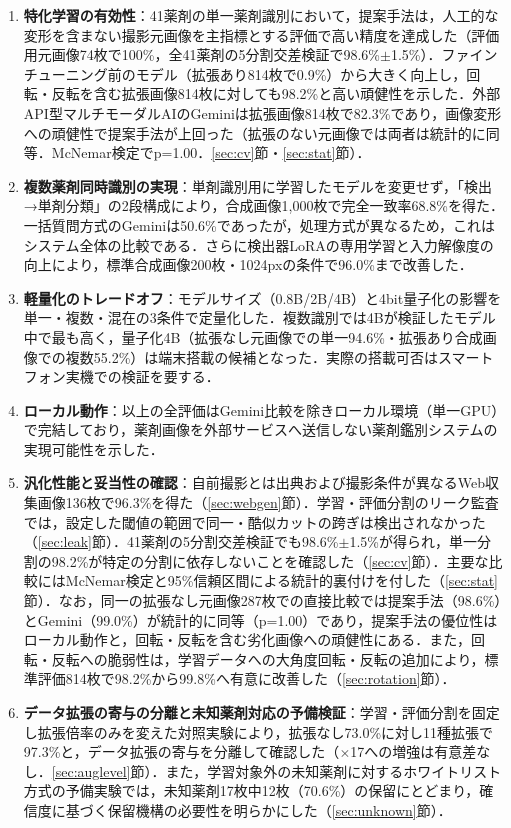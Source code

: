 \documentclass[dvipdfmx]{jsarticle}
\begin{document}
\begin{enumerate}
  \item \textbf{特化学習の有効性}：41薬剤の単一薬剤識別において，提案手法は，人工的な変形を含まない撮影元画像を主指標とする評価で高い精度を達成した（評価用元画像74枚で100\%，全41薬剤の5分割交差検証で98.6\%$\pm$1.5\%）．ファインチューニング前のモデル（拡張あり814枚で0.9\%）から大きく向上し，回転・反転を含む拡張画像814枚に対しても98.2\%と高い頑健性を示した．外部API型マルチモーダルAIのGeminiは拡張画像814枚で82.3\%であり，画像変形への頑健性で提案手法が上回った（拡張のない元画像では両者は統計的に同等．McNemar検定でp=1.00．\ref{sec:cv}節・\ref{sec:stat}節）．
  \item \textbf{複数薬剤同時識別の実現}：単剤識別用に学習したモデルを変更せず，「検出→単剤分類」の2段構成により，合成画像1,000枚で完全一致率68.8\%を得た．一括質問方式のGeminiは50.6\%であったが，処理方式が異なるため，これはシステム全体の比較である．さらに検出器LoRAの専用学習と入力解像度の向上により，標準合成画像200枚・1024pxの条件で96.0\%まで改善した．
  \item \textbf{軽量化のトレードオフ}：モデルサイズ（0.8B/2B/4B）と4bit量子化の影響を単一・複数・混在の3条件で定量化した．複数識別では4Bが検証したモデル中で最も高く，量子化4B（拡張なし元画像での単一94.6\%・拡張あり合成画像での複数55.2\%）は端末搭載の候補となった．実際の搭載可否はスマートフォン実機での検証を要する．
  \item \textbf{ローカル動作}：以上の全評価はGemini比較を除きローカル環境（単一GPU）で完結しており，薬剤画像を外部サービスへ送信しない薬剤鑑別システムの実現可能性を示した．
  \item \textbf{汎化性能と妥当性の確認}：自前撮影とは出典および撮影条件が異なるWeb収集画像136枚で96.3\%を得た（\ref{sec:webgen}節）．学習・評価分割のリーク監査では，設定した閾値の範囲で同一・酷似カットの跨ぎは検出されなかった（\ref{sec:leak}節）．41薬剤の5分割交差検証でも98.6\%$\pm$1.5\%が得られ，単一分割の98.2\%が特定の分割に依存しないことを確認した（\ref{sec:cv}節）．主要な比較にはMcNemar検定と95\%信頼区間による統計的裏付けを付した（\ref{sec:stat}節）．なお，同一の拡張なし元画像287枚での直接比較では提案手法（98.6\%）とGemini（99.0\%）が統計的に同等（p=1.00）であり，提案手法の優位性はローカル動作と，回転・反転を含む劣化画像への頑健性にある．また，回転・反転への脆弱性は，学習データへの大角度回転・反転の追加により，標準評価814枚で98.2\%から99.8\%へ有意に改善した（\ref{sec:rotation}節）．
  \item \textbf{データ拡張の寄与の分離と未知薬剤対応の予備検証}：学習・評価分割を固定し拡張倍率のみを変えた対照実験により，拡張なし73.0\%に対し11種拡張で97.3\%と，データ拡張の寄与を分離して確認した（$\times$17への増強は有意差なし．\ref{sec:auglevel}節）．また，学習対象外の未知薬剤に対するホワイトリスト方式の予備実験では，未知薬剤17枚中12枚（70.6\%）の保留にとどまり，確信度に基づく保留機構の必要性を明らかにした（\ref{sec:unknown}節）．
\end{enumerate}
\end{document}
